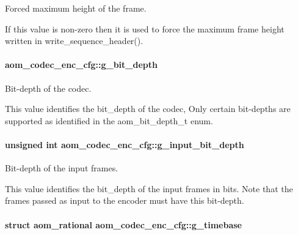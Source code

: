 Forced maximum height of the frame. 

If this value is non-\/zero then it is used to force the maximum frame height written in write\+\_\+sequence\+\_\+header(). 
\paragraph[{\texorpdfstring{g\+\_\+bit\+\_\+depth}{g_bit_depth}}]{ aom\+\_\+codec\+\_\+enc\+\_\+cfg\+::g\+\_\+bit\+\_\+depth}\hypertarget{structaom__codec__enc__cfg_a76a27f44cded1516803a776a0a7e9038}{}\label{structaom__codec__enc__cfg_a76a27f44cded1516803a776a0a7e9038}


Bit-\/depth of the codec. 

This value identifies the bit\+\_\+depth of the codec, Only certain bit-\/depths are supported as identified in the aom\+\_\+bit\+\_\+depth\+\_\+t enum. 
\paragraph[{\texorpdfstring{g\+\_\+input\+\_\+bit\+\_\+depth}{g_input_bit_depth}}]{\setlength{\rightskip}{0pt plus 5cm}unsigned int aom\+\_\+codec\+\_\+enc\+\_\+cfg\+::g\+\_\+input\+\_\+bit\+\_\+depth}\hypertarget{structaom__codec__enc__cfg_a021aed8496604b1ad3af2c51f52d075d}{}\label{structaom__codec__enc__cfg_a021aed8496604b1ad3af2c51f52d075d}


Bit-\/depth of the input frames. 

This value identifies the bit\+\_\+depth of the input frames in bits. Note that the frames passed as input to the encoder must have this bit-\/depth. 
\paragraph[{\texorpdfstring{g\+\_\+timebase}{g_timebase}}]{\setlength{\rightskip}{0pt plus 5cm}struct {\bf aom\+\_\+rational} aom\+\_\+codec\+\_\+enc\+\_\+cfg\+::g\+\_\+timebase}\hypertarget{structaom__codec__enc__cfg_a10664f1fc5b6ec29b77ee13efeeecdf7}{}\label{structaom__codec__enc__cfg_a10664f1fc5b6ec29b77ee13efeeecdf7}


